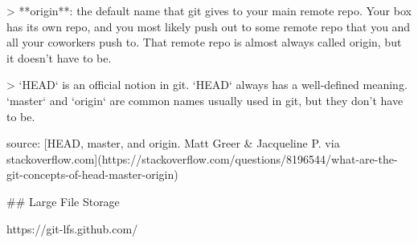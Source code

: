 > **origin**: the default name that git gives to your main remote repo. Your box has its own repo, and you most likely push out to some remote repo that you and all your coworkers push to. That remote repo is almost always called origin, but it doesn't have to be.

> `HEAD` is an official notion in git. `HEAD` always has a well-defined meaning. `master` and `origin` are common names usually used in git, but they don't have to be.

source: [HEAD, master, and origin. Matt Greer \& Jacqueline P. via stackoverflow.com](https://stackoverflow.com/questions/8196544/what-are-the-git-concepts-of-head-master-origin)

## Large File Storage

https://git-lfs.github.com/
